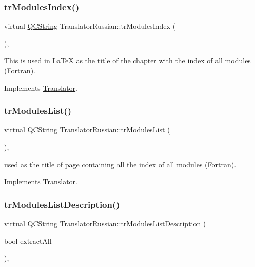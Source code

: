 \subsubsection{\texorpdfstring{trModulesIndex()}{trModulesIndex()}}
{\footnotesize\ttfamily virtual \mbox{\hyperlink{class_q_c_string}{Q\+C\+String}} Translator\+Russian\+::tr\+Modules\+Index (\begin{DoxyParamCaption}{ }\end{DoxyParamCaption})\hspace{0.3cm}{\ttfamily [inline]}, {\ttfamily [virtual]}}

This is used in La\+TeX as the title of the chapter with the index of all modules (Fortran). 

Implements \mbox{\hyperlink{class_translator}{Translator}}.

\mbox{\label{class_translator_russian_a8d5c924638222b529d0a1a8baf6ca2e7}} 
\subsubsection{\texorpdfstring{trModulesList()}{trModulesList()}}
{\footnotesize\ttfamily virtual \mbox{\hyperlink{class_q_c_string}{Q\+C\+String}} Translator\+Russian\+::tr\+Modules\+List (\begin{DoxyParamCaption}{ }\end{DoxyParamCaption})\hspace{0.3cm}{\ttfamily [inline]}, {\ttfamily [virtual]}}

used as the title of page containing all the index of all modules (Fortran). 

Implements \mbox{\hyperlink{class_translator}{Translator}}.

\mbox{\label{class_translator_russian_ac968d3f7b5d617a3249013b8e970db5f}} 
\subsubsection{\texorpdfstring{trModulesListDescription()}{trModulesListDescription()}}
{\footnotesize\ttfamily virtual \mbox{\hyperlink{class_q_c_string}{Q\+C\+String}} Translator\+Russian\+::tr\+Modules\+List\+Description (\begin{DoxyParamCaption}\item[{bool}]{extract\+All }\end{DoxyParamCaption})\hspace{0.3cm}{\ttfamily [inline]}, {\ttfamily [virtual]}}

